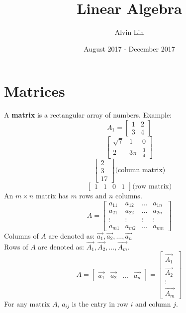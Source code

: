 \documentclass[letterpaper, 12pt]{math}
\title{Linear Algebra}
\author{Alvin Lin}
\date{August 2017 - December 2017}
\begin{document}
\maketitle

\section*{Matrices}
A \textbf{matrix} is a rectangular array of numbers. Example:
\[ A_1 = \begin{bmatrix}1 & 2 \\ 3 & 4\end{bmatrix} \]
\[ \begin{bmatrix}\sqrt{7} & 1 & 0 \\ 2 & 3\pi & \frac{3}{4}\end{bmatrix} \]
\[ \begin{bmatrix}2 \\ 3 \\ 17\end{bmatrix} \text{(column matrix)} \]
\[ \begin{bmatrix}1 & 1 & 0 & 1\end{bmatrix} \text{(row matrix)} \]
An \( m\times n \) matrix has \( m \) rows and \( n \) columns.
\[ A = \begin{bmatrix}
  a_{11} & a_{12} & \dots & a_{1n} \\
  a_{21} & a_{22} & \dots & a_{2n} \\
  \vdots & \vdots & \vdots & \vdots \\
  a_{m1} & a_{m2} & \dots & a_{mn}
\end{bmatrix} \]
Columns of \( A \) are denoted as: \( \vec{a_1},\vec{a_2},\dots,\vec{a_n} \) \\
Rows of \( A \) are denoted as: \( \vec{A_1},\vec{A_2},\dots,\vec{A_m} \).
\[ A = \begin{bmatrix}\vec{a_1} & \vec{a_2} & \dots & \vec{a_n}\end{bmatrix} =
  \begin{bmatrix}\vec{A_1} \\ \vec{A_2} \\ \vdots \\ \vec{A_m}\end{bmatrix} \]
For any matrix \( A \), \( a_{ij} \) is the entry in row \( i \) and column
\( j \).
\end{document}
